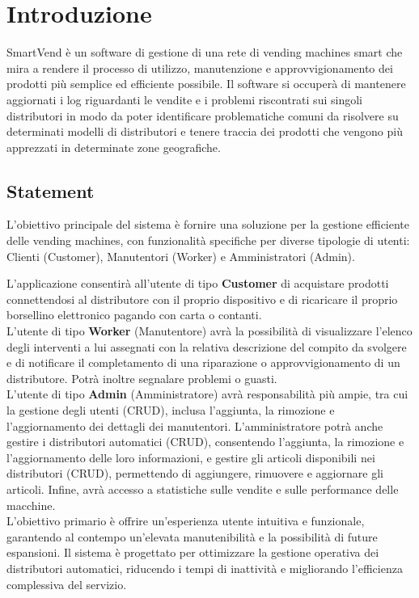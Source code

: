 \section{Introduzione}
SmartVend è un software di gestione di una rete di vending machines smart che mira a rendere il processo di utilizzo, manutenzione e approvvigionamento dei prodotti più semplice ed efficiente possibile. Il software si occuperà di mantenere aggiornati i log riguardanti le vendite e i problemi riscontrati sui singoli distributori in modo da poter identificare problematiche comuni da risolvere su determinati modelli di distributori e tenere traccia dei prodotti che vengono più apprezzati in determinate zone geografiche.

\subsection{Statement}
L'obiettivo principale del sistema è fornire una soluzione per la gestione efficiente delle vending machines, con funzionalità specifiche per diverse tipologie di utenti: Clienti (Customer), Manutentori (Worker) e Amministratori (Admin).

L'applicazione consentirà all'utente di tipo \textbf{Customer} di acquistare prodotti connettendosi al distributore con il proprio dispositivo e di ricaricare il proprio borsellino elettronico pagando con carta o contanti.\\

L'utente di tipo \textbf{Worker} (Manutentore) avrà la possibilità di visualizzare l'elenco degli interventi a lui assegnati con la relativa descrizione del compito da svolgere e di notificare il completamento di una riparazione o approvvigionamento di un distributore. Potrà inoltre segnalare problemi o guasti.\\

L'utente di tipo \textbf{Admin} (Amministratore) avrà responsabilità più ampie, tra cui la gestione degli utenti (CRUD), inclusa l'aggiunta, la rimozione e l'aggiornamento dei dettagli dei manutentori. L'amministratore potrà anche gestire i distributori automatici (CRUD), consentendo l'aggiunta, la rimozione e l'aggiornamento delle loro informazioni, e gestire gli articoli disponibili nei distributori (CRUD), permettendo di aggiungere, rimuovere e aggiornare gli articoli. Infine, avrà accesso a statistiche sulle vendite e sulle performance delle macchine.\\

L'obiettivo primario è offrire un'esperienza utente intuitiva e funzionale, garantendo al contempo un'elevata manutenibilità e la possibilità di future espansioni. Il sistema è progettato per ottimizzare la gestione operativa dei distributori automatici, riducendo i tempi di inattività e migliorando l'efficienza complessiva del servizio.
